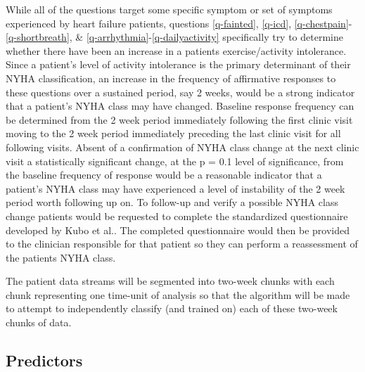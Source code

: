 \documentclass[]{article}
\begin{document}
While all of the questions target some specific symptom or set of symptoms experienced by heart failure patients, questions \ref{q-fainted}, \ref{q-icd}, \ref{q-chestpain}-\ref{q-shortbreath}, \& \ref{q-arrhythmia}-\ref{q-dailyactivity} specifically try to determine whether there have been an increase in a patients exercise/activity intolerance. Since a patient's level of activity intolerance is the primary determinant of their NYHA classification, an increase in the frequency of affirmative responses to these questions over a sustained period, say 2 weeks, would be a strong indicator that a patient's NYHA class may have changed. Baseline response frequency can be determined from the 2 week period immediately following the first clinic visit moving to the 2 week period immediately preceding the last clinic visit for all following visits. Absent of a confirmation of NYHA class change at the next clinic visit a statistically significant change, at the p = 0.1 level of significance, from the baseline frequency of response would be a reasonable indicator that a patient's NYHA class may have experienced a level of instability of the 2 week period worth following up on. To follow-up and verify a possible NYHA class change patients would be requested to complete the standardized questionnaire developed by Kubo et al.\@\cite{Kubo2004}. The completed questionnaire would then be provided to the clinician responsible for that patient so they can perform a reassessment of the patients NYHA class.

The patient data streams will be segmented into two-week chunks with each chunk representing one time-unit of analysis so that the algorithm will be made to attempt to independently classify (and trained on) each of these two-week chunks of data.

\subsection{Predictors} \label{sec:predictors} %
\end{document}
